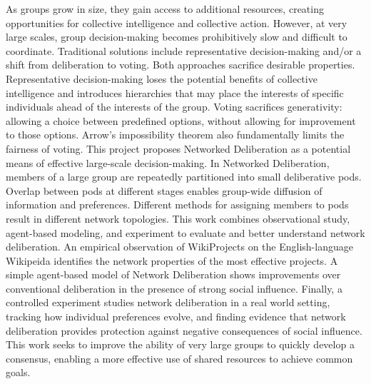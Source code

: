 As groups grow in size, they gain access to additional resources, creating opportunities for collective intelligence and collective action.
However, at very large scales, group decision-making becomes prohibitively slow and difficult to coordinate.
Traditional solutions include representative decision-making and/or a shift from deliberation to voting.
Both approaches sacrifice desirable properties.
Representative decision-making loses the potential benefits of collective intelligence and introduces hierarchies that may place the interests of specific individuals ahead of the interests of the group.
Voting sacrifices generativity: allowing a choice between predefined options, without allowing for improvement to those options.
Arrow’s impossibility theorem also fundamentally limits the fairness of voting.
This project proposes Networked Deliberation as a potential means of effective large-scale decision-making.
In Networked Deliberation, members of a large group are repeatedly partitioned into small deliberative pods.
Overlap between pods at different stages enables group-wide diffusion of information and preferences.
Different methods for assigning members to pods result in different network topologies.
This work combines observational study, agent-based modeling, and experiment to evaluate and better understand network deliberation.
An empirical observation of WikiProjects on the English-language Wikipeida identifies the network properties of the most effective projects.
A simple agent-based model of Network Deliberation shows improvements over conventional deliberation in the presence of strong social influence.
Finally, a controlled experiment studies network deliberation in a real world setting, tracking how individual preferences evolve, and finding evidence that network deliberation provides protection against negative consequences of social influence.
This work seeks to improve the ability of very large groups to quickly develop a consensus, enabling a more effective use of shared resources to achieve common goals.
